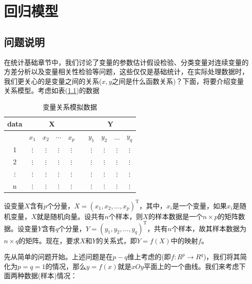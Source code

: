 % 
\chapter{回归模型}
\section{问题说明}\label{sec:问题说明}
    \par
    在统计基础章节中，我们讨论了变量的参数估计假设检验、分类变量对连续变量的方差分析以及变量相关性检验等问题，这些仅仅是基础统计，在实际处理数据时，我们更关心的是变量之间的关系($x,y$之间是什么函数关系)？下面，将要介绍变量关系模型。考虑如表(\ref{tab:变量关系模拟数据})的数据
    \begin{table}[H]
    \caption{变量关系模拟数据}
    \label{tab:变量关系模拟数据}
    \centering
    \begin{tabular}{|c|ccccccccc|}
    \hline
    data & \multicolumn{4}{c}{X} & {} & \multicolumn{4}{c|}{Y} \\
    \hline
    {} & $x_1$ & $x_2$ & $\cdots$ & $x_p$ & {} & $y_1$ & $y_2$ & $\ldots$ & $y_q$ \\
    \hline
    1  & $\vdots$ &  $\vdots$  & $\vdots$ & $\vdots$ & {} & $\vdots$ &  $\vdots$  & $\vdots$ & $\vdots$\\
    2  & $\vdots$ &  $\vdots$  & $\vdots$ & $\vdots$ & {} & $\vdots$ &  $\vdots$  & $\vdots$ & $\vdots$\\
    $\vdots$ & $\vdots$ &  $\vdots$  & $\vdots$ & $\vdots$ & {} & $\vdots$ &  $\vdots$  & $\vdots$ & $\vdots$\\
    n  & $\vdots$ &  $\vdots$  & $\vdots$ & $\vdots$ & {} & $\vdots$ &  $\vdots$  & $\vdots$ & $\vdots$\\
    \hline
    \end{tabular}
    \end{table}
    \par
    设变量$X$含有$p$个分量，$X = (x_1,x_2,\dots,x_p)^\mathrm{T}$，其中，$x_i$是一个变量，如果$x_i$是随机变量，$X$就是随机向量。设共有$n$个样本，则$X$的样本数据是一个$n\times p$的矩阵数据。设变量$Y$含有$q$个分量，$Y = (y_1,y_2,\dots,y_q)^{\mathrm{T}}$，共有$n$个样本，故其样本数据为$n\times q$的矩阵。现在，要求$X$和$Y$的关系式，即$Y = f(X)$中的映射$f$。
    \par
    先从简单的问题开始。上述问题是在$p-q$维上考虑的(即$f :R^p\rightarrow R^q$)，我们将其简化为$p = q=1$的情况，那么$y = f(x)$就是$xOy$平面上的一个曲线。我们来考虑下面两种数据(样本)情况：\\

